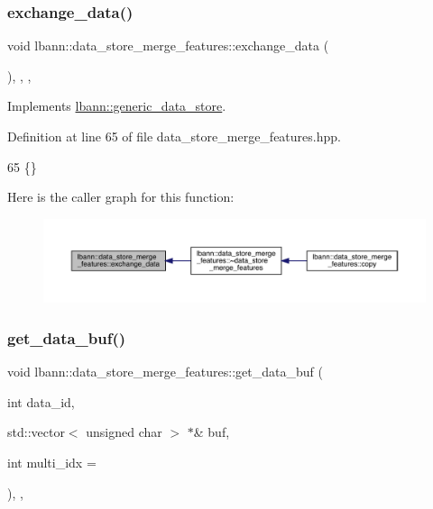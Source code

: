\subsubsection{\texorpdfstring{exchange\+\_\+data()}{exchange\_data()}}
{\footnotesize\ttfamily void lbann\+::data\+\_\+store\+\_\+merge\+\_\+features\+::exchange\+\_\+data (\begin{DoxyParamCaption}{ }\end{DoxyParamCaption})\hspace{0.3cm}{\ttfamily [inline]}, {\ttfamily [override]}, {\ttfamily [protected]}, {\ttfamily [virtual]}}



Implements \hyperlink{classlbann_1_1generic__data__store_a5a34663fbbc3714d45743a6ca7195f51}{lbann\+::generic\+\_\+data\+\_\+store}.



Definition at line 65 of file data\+\_\+store\+\_\+merge\+\_\+features.\+hpp.


\begin{DoxyCode}
65 \{\}
\end{DoxyCode}
Here is the caller graph for this function\+:\nopagebreak
\begin{figure}[H]
\begin{center}
\leavevmode
\includegraphics[width=350pt]{classlbann_1_1data__store__merge__features_a6a55e3959727a104b4470ba51e0988c3_icgraph}
\end{center}
\end{figure}
\mbox{\label{classlbann_1_1data__store__merge__features_ac95dff58de75fba572f34d56ceec3732}} 
\subsubsection{\texorpdfstring{get\+\_\+data\+\_\+buf()}{get\_data\_buf()}}
{\footnotesize\ttfamily void lbann\+::data\+\_\+store\+\_\+merge\+\_\+features\+::get\+\_\+data\+\_\+buf (\begin{DoxyParamCaption}\item[{int}]{data\+\_\+id,  }\item[{std\+::vector$<$ unsigned char $>$ $\ast$\&}]{buf,  }\item[{int}]{multi\+\_\+idx = {} }\end{DoxyParamCaption})\hspace{0.3cm}{\ttfamily [inline]}, {\ttfamily [override]}, {\ttfamily [virtual]}}



